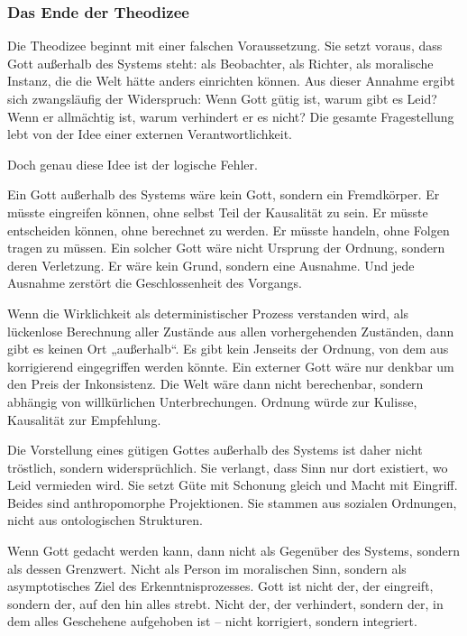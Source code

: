 \documentclass[
  ngerman,
]{article}
\begin{document}
\subsubsection{\texorpdfstring{\textbf{Das Ende der
Theodizee}}{Das Ende der Theodizee}}\label{das-ende-der-theodizee}

Die Theodizee beginnt mit einer falschen Voraussetzung. Sie setzt
voraus, dass Gott außerhalb des Systems steht: als Beobachter, als
Richter, als moralische Instanz, die die Welt hätte anders einrichten
können. Aus dieser Annahme ergibt sich zwangsläufig der Widerspruch:
Wenn Gott gütig ist, warum gibt es Leid? Wenn er allmächtig ist, warum
verhindert er es nicht? Die gesamte Fragestellung lebt von der Idee
einer externen Verantwortlichkeit.

Doch genau diese Idee ist der logische Fehler.

Ein Gott außerhalb des Systems wäre kein Gott, sondern ein Fremdkörper.
Er müsste eingreifen können, ohne selbst Teil der Kausalität zu sein. Er
müsste entscheiden können, ohne berechnet zu werden. Er müsste handeln,
ohne Folgen tragen zu müssen. Ein solcher Gott wäre nicht Ursprung der
Ordnung, sondern deren Verletzung. Er wäre kein Grund, sondern eine
Ausnahme. Und jede Ausnahme zerstört die Geschlossenheit des Vorgangs.

Wenn die Wirklichkeit als deterministischer Prozess verstanden wird, als
lückenlose Berechnung aller Zustände aus allen vorhergehenden Zuständen,
dann gibt es keinen Ort „außerhalb``. Es gibt kein Jenseits der Ordnung,
von dem aus korrigierend eingegriffen werden könnte. Ein externer Gott
wäre nur denkbar um den Preis der Inkonsistenz. Die Welt wäre dann nicht
berechenbar, sondern abhängig von willkürlichen Unterbrechungen. Ordnung
würde zur Kulisse, Kausalität zur Empfehlung.

Die Vorstellung eines gütigen Gottes außerhalb des Systems ist daher
nicht tröstlich, sondern widersprüchlich. Sie verlangt, dass Sinn nur
dort existiert, wo Leid vermieden wird. Sie setzt Güte mit Schonung
gleich und Macht mit Eingriff. Beides sind anthropomorphe Projektionen.
Sie stammen aus sozialen Ordnungen, nicht aus ontologischen Strukturen.

Wenn Gott gedacht werden kann, dann nicht als Gegenüber des Systems,
sondern als dessen Grenzwert. Nicht als Person im moralischen Sinn,
sondern als asymptotisches Ziel des Erkenntnisprozesses. Gott ist nicht
der, der eingreift, sondern der, auf den hin alles strebt. Nicht der,
der verhindert, sondern der, in dem alles Geschehene aufgehoben ist --
nicht korrigiert, sondern integriert.
\end{document}
